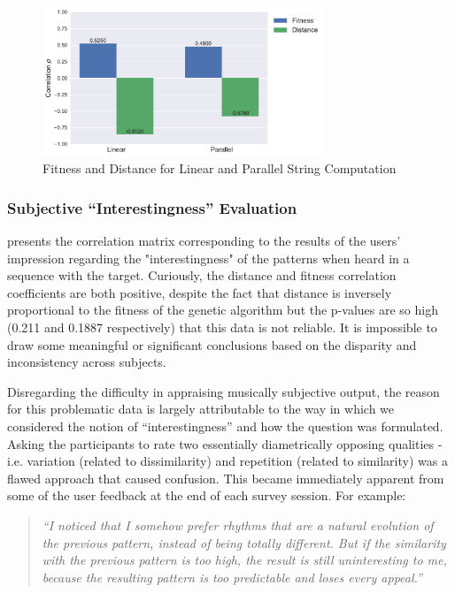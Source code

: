 {{\begin{figure}
	\begin{center}
		\includegraphics[width=0.75\textwidth]{ch03_symbolic/figures/reps_bar.pdf}
	\end{center}
	\caption[Fitness and Distance for Linear and Parallel String Computation]{Fitness and Distance for Linear and Parallel String Computation}
	\label{fig:linear_versus_parallel}
\end{figure}


\subsubsection{Subjective “Interestingness” Evaluation}

 presents the correlation matrix corresponding to the results of the users' impression regarding the "interestingness" of the patterns when heard in a sequence with the target. Curiously, the distance and fitness correlation coefficients are both positive, despite the fact that distance is inversely proportional to the fitness of the genetic algorithm but the p-values are so high (0.211 and 0.1887 respectively) that this data is not reliable. It is impossible to draw some meaningful or significant conclusions based on the disparity and inconsistency across subjects.

Disregarding the difficulty in appraising musically subjective output, the reason for this problematic data is largely attributable to the way in which we considered the notion of ``interestingness'' and how the question was formulated. Asking the participants to rate two essentially diametrically opposing qualities - i.e. variation (related to dissimilarity) and repetition (related to similarity) was a flawed approach that caused confusion. This became immediately apparent from some of the user feedback at the end of each survey session. For example:

\blockquote{\textit{“I noticed that I somehow prefer rhythms that are a natural
evolution of the previous pattern, instead of being totally different. But if the similarity with the previous pattern is too high, the result is still uninteresting to me, because the resulting pattern is too predictable and loses every appeal.”}}

}}
